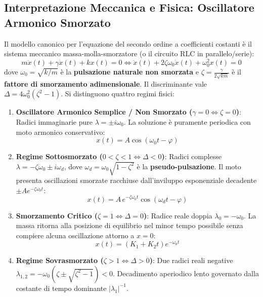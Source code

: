 \subsection{Interpretazione Meccanica e Fisica: Oscillatore Armonico Smorzato}

Il modello canonico per l'equazione del secondo ordine a coefficienti costanti è il sistema meccanico massa-molla-smorzatore (o il circuito RLC in parallelo/serie):
\begin{equation}
    \label{eq:oscillatore_fisica}
    m \ddot{x}(t) + \gamma \dot{x}(t) + k x(t) = 0 \iff \ddot{x}(t) + 2\zeta \omega_0 \dot{x}(t) + \omega_0^2 x(t) = 0
\end{equation}
dove $\omega_0 = \sqrt{k/m}$ è la \textbf{pulsazione naturale non smorzata} e $\zeta = \frac{\gamma}{2\sqrt{km}}$ è il \textbf{fattore di smorzamento adimensionale}.
Il discriminante vale $\Delta = 4\omega_0^2(\zeta^2 - 1)$. Si distinguono quattro regimi fisici:

\begin{enumerate}
    \item \textbf{Oscillatore Armonico Semplice / Non Smorzato ($\gamma = 0 \iff \zeta = 0$)}:
    Radici immaginarie pure $\lambda = \pm i\omega_0$. La soluzione è puramente periodica con moto armonico conservativo:
    \[
        x(t) = A \cos(\omega_0 t - \varphi)
    \]
    
    \item \textbf{Regime Sottosmorzato ($0 < \zeta < 1 \iff \Delta < 0$)}:
    Radici complesse $\lambda = -\zeta\omega_0 \pm i\omega_d$, dove $\omega_d = \omega_0 \sqrt{1 - \zeta^2}$ è la \textbf{pseudo-pulsazione}. Il moto presenta oscillazioni smorzate racchiuse dall'inviluppo esponenziale decadente $\pm A e^{-\zeta\omega_0 t}$:
    \[
        x(t) = A\, e^{-\zeta\omega_0 t} \cos(\omega_d t - \varphi)
    \]
    
    \item \textbf{Smorzamento Critico ($\zeta = 1 \iff \Delta = 0$)}:
    Radice reale doppia $\lambda_0 = -\omega_0$. La massa ritorna alla posizione di equilibrio nel minor tempo possibile senza compiere alcuna oscillazione attorno a $x=0$:
    \[
        x(t) = (K_1 + K_2 t) e^{-\omega_0 t}
    \]
    
    \item \textbf{Regime Sovrasmorzato ($\zeta > 1 \iff \Delta > 0$)}:
    Due radici reali negative $\lambda_{1,2} = -\omega_0(\zeta \pm \sqrt{\zeta^2 - 1}) < 0$. Decadimento aperiodico lento governato dalla costante di tempo dominante $|\lambda_1|^{-1}$.
\end{enumerate}

